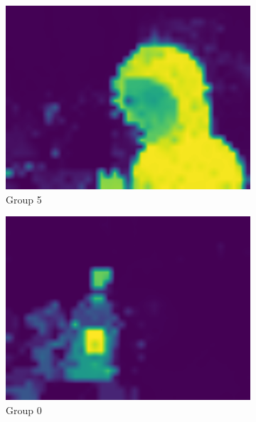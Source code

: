 \begin{figure}[t]
\begin{subfigure}{0.19\textwidth}
    \includegraphics[width=\linewidth]{Images/all group tokens/10/attn_map5withouttitle.pdf}
    \caption{Group 5}
\end{subfigure}
\hfill
\begin{subfigure}{0.19\textwidth}
    \centering
    \includegraphics[width=\linewidth]{Images/all group tokens/10/attn_map0withouttitle.pdf}
    \caption{Group 0}
\end{subfigure}
\hfill
\begin{subfigure}{0.19\textwidth}
    \centering

\end{subfigure}
\end{figure}
